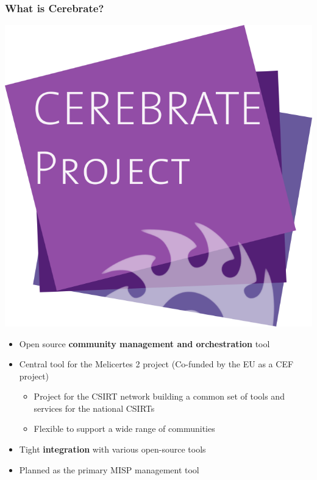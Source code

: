 \begin{frame}
    \frametitle{What is Cerebrate?}
    \begin{center}
        \includegraphics[scale=0.10]{pictures/cerebrate-logo.png}
    \end{center}
    \begin{itemize}
        \item Open source {\bf community management and orchestration} tool
        \item Central tool for the Melicertes 2 project (Co-funded by the EU as a CEF project)
        \begin{itemize}
            \item Project for the CSIRT network building a common set of tools and services for the national CSIRTs
            \item Flexible to support a wide range of communities
        \end{itemize}
        \item Tight \textbf{integration} with various open-source tools
        \item Planned as the primary MISP management tool
    \end{itemize}
\end{frame}

